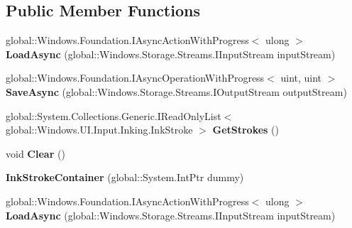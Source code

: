 \subsection*{Public Member Functions}
\begin{DoxyCompactItemize}
\item 
\mbox{\label{class_windows_1_1_u_i_1_1_input_1_1_inking_1_1_ink_stroke_container_a5616ede4fa36b0beea0b9be54c099ebb}} 
global\+::\+Windows.\+Foundation.\+I\+Async\+Action\+With\+Progress$<$ ulong $>$ {\bfseries Load\+Async} (global\+::\+Windows.\+Storage.\+Streams.\+I\+Input\+Stream input\+Stream)
\item 
\mbox{\label{class_windows_1_1_u_i_1_1_input_1_1_inking_1_1_ink_stroke_container_a40e4584e1273ad7c496cac055b5d57c9}} 
global\+::\+Windows.\+Foundation.\+I\+Async\+Operation\+With\+Progress$<$ uint, uint $>$ {\bfseries Save\+Async} (global\+::\+Windows.\+Storage.\+Streams.\+I\+Output\+Stream output\+Stream)
\item 
\mbox{\label{class_windows_1_1_u_i_1_1_input_1_1_inking_1_1_ink_stroke_container_af781d5c3e0bfb7e61a701f947102de1a}} 
global\+::\+System.\+Collections.\+Generic.\+I\+Read\+Only\+List$<$ global\+::\+Windows.\+U\+I.\+Input.\+Inking.\+Ink\+Stroke $>$ {\bfseries Get\+Strokes} ()
\item 
\mbox{\label{class_windows_1_1_u_i_1_1_input_1_1_inking_1_1_ink_stroke_container_a30539b293749d997f25488d7f6192d11}} 
void {\bfseries Clear} ()
\item 
\mbox{\label{class_windows_1_1_u_i_1_1_input_1_1_inking_1_1_ink_stroke_container_af018db7df39dc27906b9daad9fb6597c}} 
{\bfseries Ink\+Stroke\+Container} (global\+::\+System.\+Int\+Ptr dummy)
\item 
\mbox{\label{class_windows_1_1_u_i_1_1_input_1_1_inking_1_1_ink_stroke_container_a5616ede4fa36b0beea0b9be54c099ebb}} 
global\+::\+Windows.\+Foundation.\+I\+Async\+Action\+With\+Progress$<$ ulong $>$ {\bfseries Load\+Async} (global\+::\+Windows.\+Storage.\+Streams.\+I\+Input\+Stream input\+Stream)

\end{DoxyCompactItemize}
